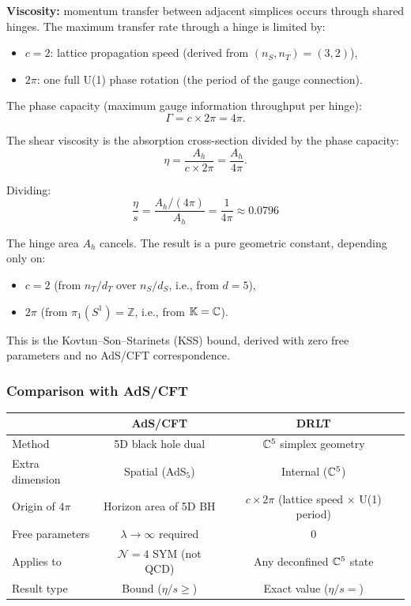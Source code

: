 \textbf{Viscosity:} momentum transfer between adjacent simplices occurs through shared hinges. The maximum transfer rate through a hinge is limited by:
\begin{itemize}
\item $c = 2$: lattice propagation speed (derived from $(n_S, n_T) = (3, 2)$),
\item $2\pi$: one full U(1) phase rotation (the period of the gauge connection).
\end{itemize}

The phase capacity (maximum gauge information throughput per hinge):
\begin{equation}
\Gamma = c \times 2\pi = 4\pi.
\end{equation}

The shear viscosity is the absorption cross-section divided by the phase capacity:
\begin{equation}
\eta = \frac{A_h}{c \times 2\pi} = \frac{A_h}{4\pi}.
\end{equation}

Dividing:
\begin{equation}
\boxed{\frac{\eta}{s} = \frac{A_h/(4\pi)}{A_h} = \frac{1}{4\pi} \approx 0.0796}
\end{equation}

The hinge area $A_h$ cancels. The result is a pure geometric constant, depending only on:
\begin{itemize}
\item $c = 2$ (from $n_T/d_T$ over $n_S/d_S$, i.e., from $d = 5$),
\item $2\pi$ (from $\pi_1(S^1) = \mathbb{Z}$, i.e., from $\mathbb{K} = \mathbb{C}$).
\end{itemize}

This is the Kovtun--Son--Starinets (KSS) bound, derived with zero free parameters and no AdS/CFT correspondence.

\subsubsection{Comparison with AdS/CFT}

\begin{center}
\begin{tabular}{lcc}
\hline
& AdS/CFT & DRLT \\
\hline
Method & 5D black hole dual & $\mathbb{C}^5$ simplex geometry \\
Extra dimension & Spatial (AdS$_5$) & Internal ($\mathbb{C}^5$) \\
Origin of $4\pi$ & Horizon area of 5D BH & $c \times 2\pi$ (lattice speed $\times$ U(1) period) \\
Free parameters & $\lambda \to \infty$ required & 0 \\
Applies to & $\mathcal{N} = 4$ SYM (not QCD) & Any deconfined $\mathbb{C}^5$ state \\
Result type & Bound ($\eta/s \geq$) & Exact value ($\eta/s =$) \\
\hline
\end{tabular}
\end{center}

